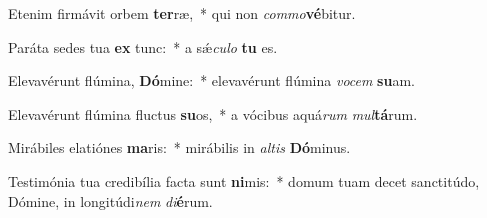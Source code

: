 \item Etenim firmávit orbem \textbf{ter}ræ,~* qui non \textit{com}\textit{mo}\textbf{vé}bitur.
\item Paráta sedes tua \textbf{ex} tunc:~* a sǽ\textit{cu}\textit{lo} \textbf{tu} es.
\item Elevavérunt flúmina, \textbf{Dó}mine:~* elevavérunt flúmina \textit{vo}\textit{cem} \textbf{su}am.
\item Elevavérunt flúmina fluctus \textbf{su}os,~* a vócibus aquá\textit{rum} \textit{mul}\textbf{tá}rum.
\item Mirábiles elatiónes \textbf{ma}ris:~* mirábilis in \textit{al}\textit{tis} \textbf{Dó}minus.
\item Testimónia tua credibília facta sunt \textbf{ni}mis:~* domum tuam decet sanctitúdo, Dómine, in longitúdi\textit{nem} \textit{di}\textbf{é}rum.
